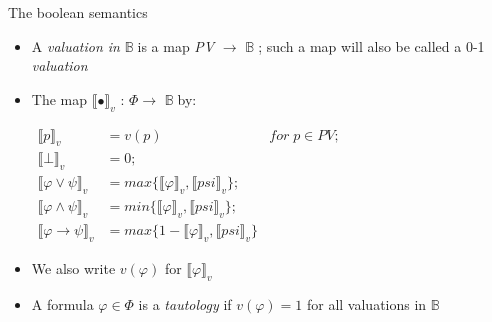 \documentclass[sans]{beamer}
\begin{document}
\newcommand{\vsem}[1]{\llbracket #1 \rrbracket_v}
\newcommand{\vmsem}[1]{$\llbracket #1 \rrbracket_v$}
\newcommand{\got}[1]{$\mathbb{#1} \;$}
\newcommand{\gotb}{\got{B}}
\newcommand{\cali}[1]{$\mathcal{#1} \;$}
\newcommand{\calr}{\cali{R}}

\begin{frame}{The boolean semantics}
  \begin{itemize}
    \item A \emph{valuation in} \gotb is a map \emph{PV} $\to$ \gotb;
      such a map will also be called a 0-1 \emph{valuation}

    \vfill

    \item The map \vmsem{\bullet} : $\Phi \to$ \gotb by:

      $\begin{aligned}
        \vsem{p} &= v(p) & for \; p \in PV; \\
        \vsem{\bot} &= 0; \\
        \vsem{\varphi \vee \psi} &= max\{\vsem{\varphi}, \vsem{psi}\}; \\
        \vsem{\varphi \wedge \psi} &= min\{\vsem{\varphi}, \vsem{psi}\};\\
        \vsem{\varphi \to \psi} &= max\{1 - \vsem{\varphi}, \vsem{psi}\}
       \end{aligned}$

    \vfill
    \item We also write $v(\varphi)$ for \vmsem{\varphi}

    \vfill
  \item A formula $\varphi \in \Phi$ is a \emph{tautology} if $v(\varphi) = 1$ for
        all valuations in \gotb
  \end{itemize}
\end{frame}
\end{document}
